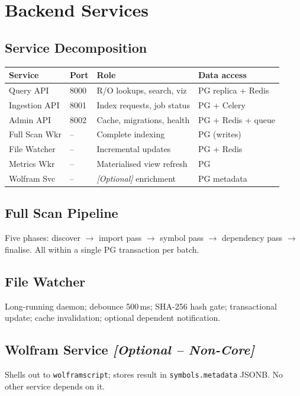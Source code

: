 \chapter{Backend Services}

\section{Service Decomposition}

\begin{table}[h]
\centering
\begin{tabular}{@{}llll@{}}
\toprule
\textbf{Service} & \textbf{Port} & \textbf{Role} & \textbf{Data access} \\
\midrule
Query API     & 8000 & R/O lookups, search, viz & PG replica + Redis \\
Ingestion API & 8001 & Index requests, job status & PG + Celery \\
Admin API     & 8002 & Cache, migrations, health & PG + Redis + queue \\
Full Scan Wkr & --   & Complete indexing         & PG (writes) \\
File Watcher  & --   & Incremental updates       & PG + Redis \\
Metrics Wkr   & --   & Materialised view refresh & PG \\
Wolfram Svc   & --   & \emph{[Optional]} enrichment & PG metadata \\
\bottomrule
\end{tabular}
\end{table}

\section{Full Scan Pipeline}
Five phases: discover $\to$ import pass $\to$ symbol pass $\to$ dependency
pass $\to$ finalise.  All within a single PG transaction per batch.

\section{File Watcher}
Long-running daemon; debounce 500\,ms; SHA-256 hash gate; transactional
update; cache invalidation; optional dependent notification.

\section{Wolfram Service \emph{[Optional -- Non-Core]}}
Shells out to \texttt{wolframscript}; stores result in
\texttt{symbols.metadata} JSONB.  No other service depends on it.
